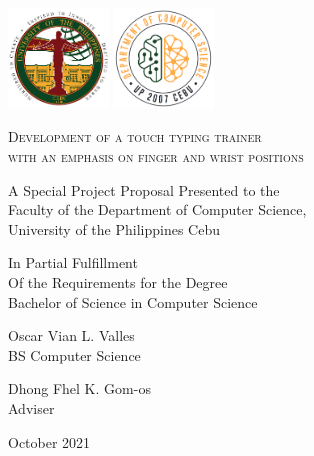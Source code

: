 \documentclass{report}
\begin{document}
\begin{titlepage}
	\centering

	\hspace{0pt}
	\vfill

	\includegraphics[width=0.2\textwidth]{upc.png}
	\includegraphics[width=0.2\textwidth]{dcs.png}
	\par\vspace{1cm}

	\textsc{Development of a touch typing trainer\\with an emphasis on finger and wrist positions}
	\par\vspace{0.5cm}

	\hrulefill
	\par\vspace{0.25cm}
	A Special Project Proposal Presented to the\\
	Faculty of the Department of Computer Science,\\
	University of the Philippines Cebu

	\par\vspace{0.25cm}
	In Partial Fulfillment\\
	Of the Requirements for the Degree\\
	Bachelor of Science in Computer Science\\
	\par\vspace{0.25cm}
	\hrulefill
	\par\vspace{0.5cm}

	Oscar Vian L. Valles\\
	BS Computer Science
	\par\vspace{0.5cm}

	Dhong Fhel K. Gom-os\\
	Adviser
	\par\vspace{0.5cm}

	October 2021
	\vfill
	\hspace{0pt}
\end{titlepage}
\newpage
\end{document}

